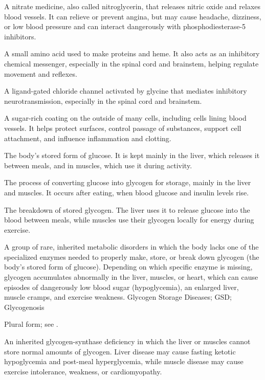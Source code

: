  A nitrate medicine, also called nitroglycerin, that releases nitric oxide and relaxes blood vessels. It can relieve or prevent angina, but may cause headache, dizziness, or low blood pressure and can interact dangerously with phosphodiesterase-5 inhibitors.

 A small amino acid used to make proteins and heme. It also acts as an inhibitory chemical messenger, especially in the spinal cord and brainstem, helping regulate movement and reflexes.

 A ligand-gated chloride channel activated by glycine that mediates inhibitory neurotransmission, especially in the spinal cord and brainstem.

 A sugar-rich coating on the outside of many cells, including cells lining blood vessels. It helps protect surfaces, control passage of substances, support cell attachment, and influence inflammation and clotting.

 The body’s stored form of glucose. It is kept mainly in the liver, which releases it between meals, and in muscles, which use it during activity.

 The process of converting glucose into glycogen for storage, mainly in the liver and muscles. It occurs after eating, when blood glucose and insulin levels rise.

 The breakdown of stored glycogen. The liver uses it to release glucose into the blood between meals, while muscles use their glycogen locally for energy during exercise.

 A group of rare, inherited metabolic disorders in which the body lacks one of the specialized enzymes needed to properly make, store, or break down glycogen (the body's stored form of glucose). Depending on which specific enzyme is missing, glycogen accumulates abnormally in the liver, muscles, or heart, which can cause episodes of dangerously low blood sugar (hypoglycemia), an enlarged liver, muscle cramps, and exercise weakness.
\synonyms
Glycogen Storage Diseases; GSD; Glycogenosis

 Plural form; see .

 An inherited glycogen-synthase deficiency in which the liver or muscles cannot store normal amounts of glycogen. Liver disease may cause fasting ketotic hypoglycemia and post-meal hyperglycemia, while muscle disease may cause exercise intolerance, weakness, or cardiomyopathy.

